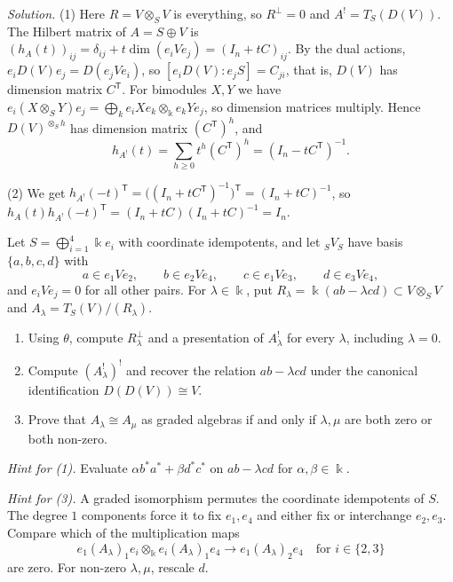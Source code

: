 \begin{hidden}
\emph{Solution.}
(1) Here $R=V\otimes_SV$ is everything, so $R^\perp=0$ and $A^!=T_S(D(V))$.
The Hilbert matrix of $A=S\oplus V$ is $(h_A(t))_{ij}=\delta_{ij}+t\dim(e_iVe_j)=(I_n+tC)_{ij}$.
By the dual actions, $e_iD(V)e_j=D(e_jVe_i)$, so $[e_iD(V):e_jS]=C_{ji}$, that is, $D(V)$ has dimension matrix $C^{\mathsf T}$.
For bimodules $X,Y$ we have $e_i(X\otimes_SY)e_j=\bigoplus_ke_iXe_k\otimes_\Bbbk e_kYe_j$, so dimension matrices multiply.
Hence $D(V)^{\otimes_Sh}$ has dimension matrix $(C^{\mathsf T})^h$, and
\[
h_{A^!}(t)=\sum_{h\geq0}t^h(C^{\mathsf T})^h=(I_n-tC^{\mathsf T})^{-1}.
\]

(2) We get $h_{A^!}(-t)^{\mathsf T}=\bigl((I_n+tC^{\mathsf T})^{-1}\bigr)^{\mathsf T}=(I_n+tC)^{-1}$, so $h_A(t)h_{A^!}(-t)^{\mathsf T}=(I_n+tC)(I_n+tC)^{-1}=I_n$.
\end{hidden}


\begin{advanced}
\begin{exercise}
Let $S=\bigoplus_{i=1}^4\Bbbk e_i$ with coordinate idempotents, and let ${}_SV_S$ have basis $\{a,b,c,d\}$ with
\[
a\in e_1Ve_2,\qquad b\in e_2Ve_4,\qquad
c\in e_1Ve_3,\qquad d\in e_3Ve_4,
\]
and $e_iVe_j=0$ for all other pairs.
For $\lambda\in\Bbbk$, put $R_\lambda=\Bbbk(ab-\lambda cd)\subset V\otimes_S V$ and $A_\lambda=T_S(V)/(R_\lambda)$.
\begin{enumerate}
\item Using $\theta$, compute $R_\lambda^\perp$ and a presentation of $A_\lambda^!$ for every $\lambda$, including $\lambda=0$.
\item Compute $(A_\lambda^!)^!$ and recover the relation $ab-\lambda cd$ under the canonical identification $D(D(V))\cong V$.
\item Prove that $A_\lambda\cong A_\mu$ as graded algebras if and only if $\lambda,\mu$ are both zero or both non-zero.
\end{enumerate}

\emph{Hint for (1).} Evaluate $\alpha b^*a^*+\beta d^*c^*$ on $ab-\lambda cd$ for $\alpha,\beta\in\Bbbk$.

\emph{Hint for (3).} A graded isomorphism permutes the coordinate idempotents of $S$.
The degree $1$ components force it to fix $e_1,e_4$ and either fix or interchange $e_2,e_3$.
Compare which of the multiplication maps
\[
e_1(A_\lambda)_1e_i\otimes_\Bbbk e_i(A_\lambda)_1e_4
\longrightarrow e_1(A_\lambda)_2e_4
\quad\text{for }i\in\{2,3\}
\]
are zero. For non-zero $\lambda,\mu$, rescale $d$.
\end{exercise}
\end{advanced}

